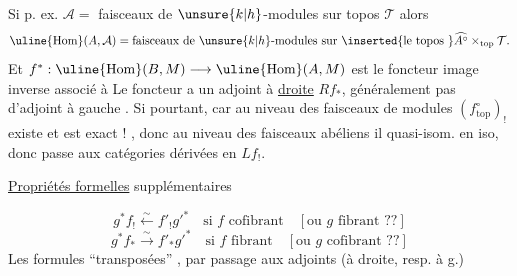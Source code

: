 Si p. ex. $\mathcal A=$ faisceaux de $\unsure{k|h}$-modules sur topos
 $\mathcal T$
alors
\[
\uline{\operatorname{Hom}}(A,\mathcal A)=
\text{faisceaux de $\unsure{k|h}$-modules sur }\inserted{\text{le topos }}
\widehat{A^\circ}\mathbin{\times_{\mathrm{top}}}\mathcal T.
\]
Et $f^*:\uline{\operatorname{Hom}}(B,M)\longrightarrow
\uline{\operatorname{Hom}}(A,M)$ est le foncteur image inverse associé à
Le foncteur 
a un adjoint à \uline{droite} $R f_*$,
 généralement pas d'adjoint à gauche
.
Si pourtant, car au niveau des  faisceaux de modules
$(f^\circ_{\mathrm{top}})_!$ existe et est exact !
, donc
au niveau des  faisceaux abéliens il
 quasi-isom. en iso, donc
passe aux catégories dérivées en $L f_!$.

\uline{Propriétés formelles} supplémentaires

\[
g^* f_!\xleftarrow{\sim}f'_!g'^*
\quad\text{si }f\text{ cofibrant}\quad[\text{ou }g\text{ fibrant ??}]
\]
\[
g^* f_*\xrightarrow{\sim}f'_*g'^*
\quad\text{si }f\text{ fibrant}\quad[\text{ou }g\text{ cofibrant ??}]
\]
Les formules  ``transposées'' ,
par passage aux adjoints (à droite, resp. à g.)

